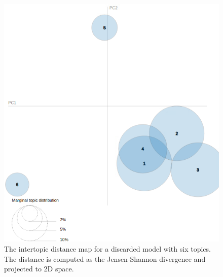 \documentclass[conference]{IEEEtran}
\begin{document}
\begin{figure}[!t]
\includegraphics[width=\linewidth]{figures/topic_dist_bad.png}
\vspace*{-8mm}
\caption{The intertopic distance map for a discarded model with six topics. The distance is computed as the Jensen-Shannon divergence and projected to 2D space.}
\label{fig:topic_dist_bad}
\end{figure}
\end{document}
